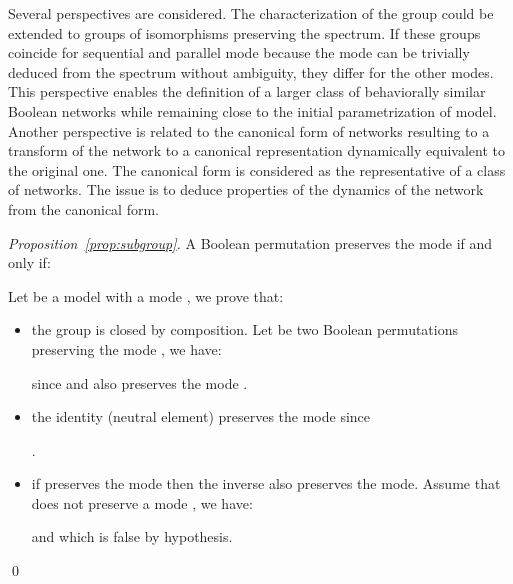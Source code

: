 \documentclass[12pt]{elsarticle}
\begin{document}
Several perspectives are considered. The characterization of the group could be extended to groups of isomorphisms preserving the spectrum. If these groups coincide for sequential and parallel mode because the mode can be trivially deduced from the spectrum without ambiguity, they differ for the other modes. This perspective enables the definition of a larger class of behaviorally similar Boolean networks while remaining close to the initial parametrization of model. Another perspective is related to the canonical form of networks resulting to  a transform of the network to a canonical representation dynamically equivalent to the original one. The canonical form is considered as the representative of a class of networks.
 The issue is to deduce properties of the dynamics of the network from the canonical form. 

\pagebreak
\appendix

\begin{proof}[Proposition~\ref{prop:subgroup}]
A Boolean permutation  preserves the mode  if and only if: 


Let  be a model with a mode , we prove that:
\begin{itemize}
\item the group is closed by composition. Let  be two Boolean permutations preserving the mode , we have: 

 since  and  also preserves the mode .
\item the identity (neutral element)  preserves the mode since 

.
\item if  preserves the mode  then the inverse  also preserves the mode. 
Assume that  does not preserve a mode , we have:

 and  which is false by hypothesis.
\end{itemize} 
\qed \end{proof}
\end{document}
